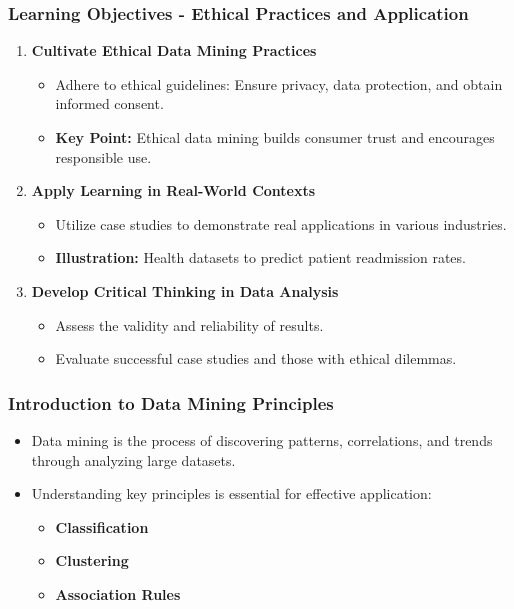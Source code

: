 \documentclass[aspectratio=169]{beamer}
\begin{document}
\begin{frame}[fragile]
    \frametitle{Learning Objectives - Ethical Practices and Application}
    \begin{enumerate}[resume]
        \item \textbf{Cultivate Ethical Data Mining Practices}
        \begin{itemize}
            \item Adhere to ethical guidelines: Ensure privacy, data protection, and obtain informed consent.
            \item \textbf{Key Point:} Ethical data mining builds consumer trust and encourages responsible use.
        \end{itemize}
        
        \item \textbf{Apply Learning in Real-World Contexts}
        \begin{itemize}
            \item Utilize case studies to demonstrate real applications in various industries.
            \item \textbf{Illustration:} Health datasets to predict patient readmission rates.
        \end{itemize}
        
        \item \textbf{Develop Critical Thinking in Data Analysis}
        \begin{itemize}
            \item Assess the validity and reliability of results.
            \item Evaluate successful case studies and those with ethical dilemmas.
        \end{itemize}
    \end{enumerate}
\end{frame}

\begin{frame}[fragile]
    \frametitle{Introduction to Data Mining Principles}
    \begin{itemize}
        \item Data mining is the process of discovering patterns, correlations, and trends through analyzing large datasets.
        \item Understanding key principles is essential for effective application:
        \begin{itemize}
            \item \textbf{Classification}
            \item \textbf{Clustering}
            \item \textbf{Association Rules}
        \end{itemize}
    \end{itemize}
\end{frame}
\end{document}
